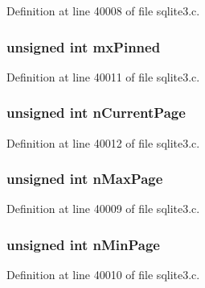 Definition at line 40008 of file sqlite3.\+c.

\hypertarget{struct_p_group_a8c213ece02546a2177eb8f35830605e8}{}
\subsubsection[{mx\+Pinned}]{\setlength{\rightskip}{0pt plus 5cm}unsigned int mx\+Pinned}\label{struct_p_group_a8c213ece02546a2177eb8f35830605e8}


Definition at line 40011 of file sqlite3.\+c.

\hypertarget{struct_p_group_ac067428645a5c7caf1f90b61438fcaac}{}
\subsubsection[{n\+Current\+Page}]{\setlength{\rightskip}{0pt plus 5cm}unsigned int n\+Current\+Page}\label{struct_p_group_ac067428645a5c7caf1f90b61438fcaac}


Definition at line 40012 of file sqlite3.\+c.

\hypertarget{struct_p_group_ac568a58f73a459ed4cce98f058f91468}{}
\subsubsection[{n\+Max\+Page}]{\setlength{\rightskip}{0pt plus 5cm}unsigned int n\+Max\+Page}\label{struct_p_group_ac568a58f73a459ed4cce98f058f91468}


Definition at line 40009 of file sqlite3.\+c.

\hypertarget{struct_p_group_a2c4b1aa5fcf28d3bf880b8bd5eac95c4}{}
\subsubsection[{n\+Min\+Page}]{\setlength{\rightskip}{0pt plus 5cm}unsigned int n\+Min\+Page}\label{struct_p_group_a2c4b1aa5fcf28d3bf880b8bd5eac95c4}


Definition at line 40010 of file sqlite3.\+c.

\hypertarget{struct_p_group_ac126ae8e5a7de715e31a5a56e306c1a5}{}
